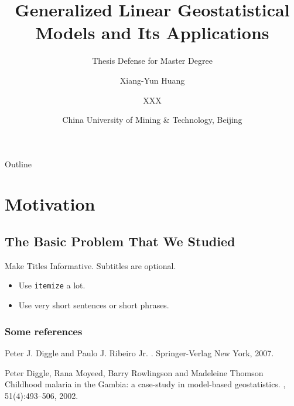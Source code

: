 \documentclass{beamer}
\title[Model-Based Geostatistics]
{Generalized Linear Geostatistical Models and Its Applications}
\subtitle{Thesis Defense for Master Degree}
\author[X.Y. Huang]{Xiang-Yun Huang\inst{1} \and XXX\inst{2}}
\institute[CUMTB] %
{
  \inst{1-2}%
  Department of Mathematics\\
  School of Science
}
\date[CUMTB 2018]{China University of Mining \& Technology, Beijing}
\begin{document}
\begin{frame}
  \titlepage
\end{frame}

\begin{frame}{Outline}
  \tableofcontents
\end{frame}

\section{Motivation}

\subsection{The Basic Problem That We Studied}

\begin{frame}{Make Titles Informative. }{Subtitles are optional.}
  \begin{itemize}
  \item
    Use \texttt{itemize} a lot.
  \item
    Use very short sentences or short phrases.
  \end{itemize}
\end{frame}


\appendix

\begin{frame}[allowframebreaks]
  \frametitle{Some references}
  \begin{thebibliography}{10}
    
  \beamertemplatebookbibitems

    Peter J. Diggle and Paulo J. {Ribeiro Jr}.
    .
    \newblock Springer-Verlag New York, 2007.
 
  \beamertemplatearticlebibitems

    Peter Diggle, Rana Moyeed, Barry Rowlingson and Madeleine Thomson
    \newblock Childhood malaria in the Gambia: a case-study in model-based geostatistics.
    , 51(4):493--506,
    2002.
  \end{thebibliography}
\end{frame}
\end{document}
